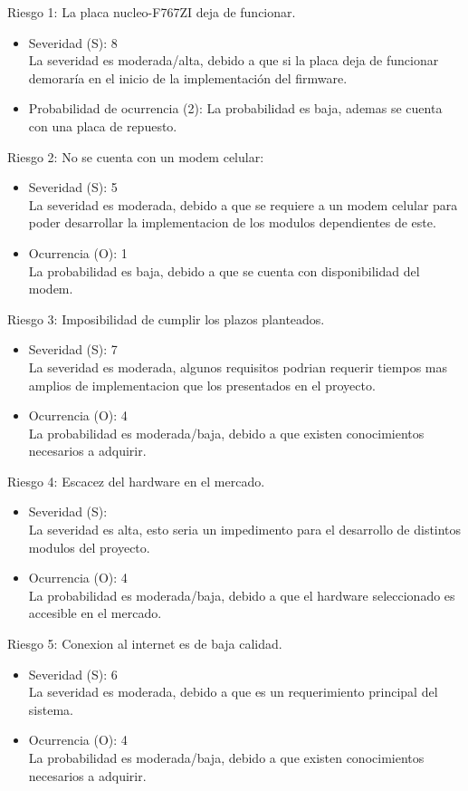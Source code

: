 \documentclass[
11pt, %
]{charter}
\begin{document}
Riesgo 1: La placa nucleo-F767ZI deja de funcionar.
\begin{itemize}
	\item Severidad (S): 8\\
	La severidad es moderada/alta, debido a que si la placa deja de funcionar demoraría en el inicio de la implementación del firmware.
	\item Probabilidad de ocurrencia (2): La probabilidad es baja, ademas se cuenta con una placa de repuesto. 
\end{itemize}   
Riesgo 2: No se cuenta con un modem celular: 
\begin{itemize}
	\item Severidad (S): 5 \\
	La severidad es moderada, debido a que se requiere a un modem celular para poder desarrollar la implementacion de los modulos dependientes de este.
	\item Ocurrencia (O): 1 \\
	La probabilidad es baja, debido a que se cuenta con disponibilidad del modem.
\end{itemize}

Riesgo 3: Imposibilidad de cumplir los plazos planteados.
\begin{itemize}
	\item Severidad (S): 7 \\
	La severidad es moderada, algunos requisitos podrian requerir tiempos mas amplios de implementacion que los presentados en el proyecto.
	\item Ocurrencia (O): 4 \\
	La probabilidad es moderada/baja, debido a que existen conocimientos necesarios a adquirir.
\end{itemize}

Riesgo 4: Escacez del hardware en el mercado.
\begin{itemize}
	\item Severidad (S):  \\
	La severidad es alta, esto seria un impedimento para el desarrollo de distintos modulos del proyecto.
	\item Ocurrencia (O): 4 \\
	La probabilidad es moderada/baja, debido a que el hardware seleccionado es accesible en el mercado.
\end{itemize}

Riesgo 5: Conexion al internet es de baja calidad.
\begin{itemize}
	\item Severidad (S): 6 \\
	La severidad es moderada, debido a que es un requerimiento principal del sistema.
	\item Ocurrencia (O): 4 \\
	La probabilidad es moderada/baja, debido a que existen conocimientos necesarios a adquirir.
\end{itemize}
\end{document}
